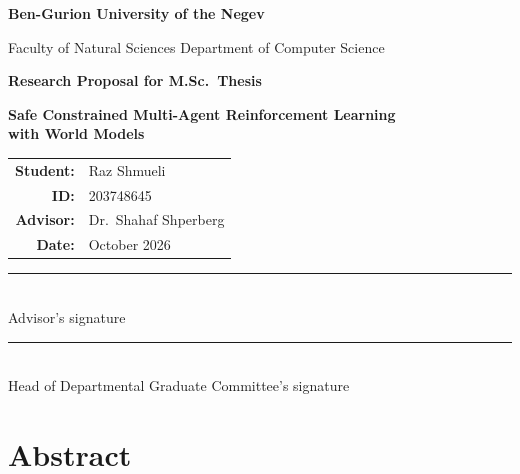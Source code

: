 \documentclass[12pt,a4paper]{article}
\begin{document}
\begin{titlepage}
\centering
\vspace*{1cm}

{\Large\bfseries Ben-Gurion University of the Negev}

\vspace{0.3cm}
{\large Faculty of Natural Sciences \textbar{} Department of Computer Science}

\vspace{1.5cm}
{\LARGE\bfseries Research Proposal for M.Sc.\ Thesis}

\vspace{1.5cm}
{\Large\bfseries Safe Constrained Multi-Agent Reinforcement Learning\\with World Models}

\vspace{2cm}

\begin{tabular}{rl}
\textbf{Student:} & Raz Shmueli \\
\textbf{ID:} & 203748645 \\
\textbf{Advisor:} & Dr.\ Shahaf Shperberg \\
\textbf{Date:} & October 2026 \\
\end{tabular}

\vspace{2cm}

\rule{6cm}{0.4pt}\\[0.3cm]
Advisor's signature

\vspace{1.5cm}

\rule{6cm}{0.4pt}\\[0.3cm]
Head of Departmental Graduate Committee's signature

\end{titlepage}

\section*{Abstract}
\end{document}
